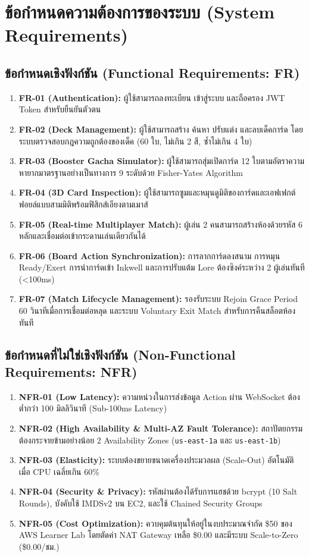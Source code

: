 \documentclass[12pt,a4paper]{report}
\begin{document}
\section{ข้อกำหนดความต้องการของระบบ (System Requirements)}

\subsection{ข้อกำหนดเชิงฟังก์ชัน (Functional Requirements: FR)}
\begin{enumerate}
    \item \textbf{FR-01 (Authentication):} ผู้ใช้สามารถลงทะเบียน เข้าสู่ระบบ และถือครอง JWT Token สำหรับยืนยันตัวตน
    \item \textbf{FR-02 (Deck Management):} ผู้ใช้สามารถสร้าง ค้นหา ปรับแต่ง และลบเด็คการ์ด โดยระบบตรวจสอบกฎความถูกต้องของเด็ค (60 ใบ, ไม่เกิน 2 สี, ซ้ำไม่เกิน 4 ใบ)
    \item \textbf{FR-03 (Booster Gacha Simulator):} ผู้ใช้สามารถสุ่มเปิดการ์ด 12 ใบตามอัตราความหายากมาตรฐานอย่างเป็นทางการ 9 ระดับด้วย Fisher-Yates Algorithm
    \item \textbf{FR-04 (3D Card Inspection):} ผู้ใช้สามารถซูมและหมุนดูมิติของการ์ดและเอฟเฟกต์ฟอยล์แบบสามมิติพร้อมฟิสิกส์เอียงตามเมาส์
    \item \textbf{FR-05 (Real-time Multiplayer Match):} ผู้เล่น 2 คนสามารถสร้างห้องด้วยรหัส 6 หลักและเชื่อมต่อเข้ากระดานเล่นเดียวกันได้
    \item \textbf{FR-06 (Board Action Synchronization):} การลากการ์ดลงสนาม การหมุน Ready/Exert การนำการ์ดเข้า Inkwell และการปรับแต้ม Lore ต้องซิงค์ระหว่าง 2 ผู้เล่นทันที (<100ms)
    \item \textbf{FR-07 (Match Lifecycle Management):} รองรับระบบ Rejoin Grace Period 60 วินาทีเมื่อการเชื่อมต่อหลุด และระบบ Voluntary Exit Match สำหรับการคืนสล็อตห้องทันที
\end{enumerate}

\subsection{ข้อกำหนดที่ไม่ใช่เชิงฟังก์ชัน (Non-Functional Requirements: NFR)}
\begin{enumerate}
    \item \textbf{NFR-01 (Low Latency):} ความหน่วงในการส่งข้อมูล Action ผ่าน WebSocket ต้องต่ำกว่า 100 มิลลิวินาที (Sub-100ms Latency)
    \item \textbf{NFR-02 (High Availability \& Multi-AZ Fault Tolerance):} สถาปัตยกรรมต้องกระจายข้ามอย่างน้อย 2 Availability Zones (\texttt{us-east-1a} และ \texttt{us-east-1b})
    \item \textbf{NFR-03 (Elasticity):} ระบบต้องขยายขนาดเครื่องประมวลผล (Scale-Out) อัตโนมัติเมื่อ CPU เฉลี่ยเกิน 60\%
    \item \textbf{NFR-04 (Security \& Privacy):} รหัสผ่านต้องได้รับการแฮชด้วย bcrypt (10 Salt Rounds), บังคับใช้ IMDSv2 บน EC2, และใช้ Chained Security Groups
    \item \textbf{NFR-05 (Cost Optimization):} ควบคุมต้นทุนให้อยู่ในงบประมาณจำกัด \$50 ของ AWS Learner Lab โดยตัดค่า NAT Gateway เหลือ \$0.00 และมีระบบ Scale-to-Zero (\$0.00/ชม.)
\end{enumerate}
\end{document}
